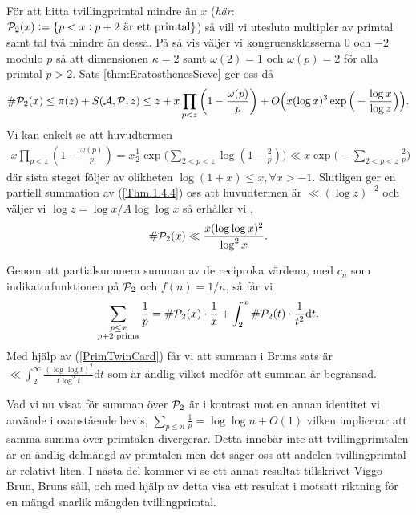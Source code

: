 För att hitta tvillingprimtal mindre än $x$ (\textit{här}: \( \P_2(x) := \{p < x : p + 2 \text{ är ett primtal}\}\)) så vill vi utesluta multipler av primtal samt tal två mindre än dessa. På så vis väljer vi kongruensklasserna $0$ och $-2$ modulo $p$ så att dimensionen \(\kappa = 2\) samt \(\omega(2) = 1\) och \(\omega(p) = 2\) för alla primtal $p > 2$. Sats \ref{thm:EratosthenesSieve} ger oss då 
\begin{align*}
    \card{\P_2(x)} \leq \pi(z) + \S{A}{P}{z} \leq z + x \prod_{p < z}\left( 1 - \frac{\omega(p)}{p} \right) + O\Big(x (\log x)^3 \exp \Big( - \frac{\log x}{\log z} \Big) \Big).
\end{align*}
Vi kan enkelt se att huvudtermen
\begin{align*}
    x \prod_{p < z}\left( 1 - \frac{\omega(p)}{p} \right) = x \frac{1}{2} \exp \Bigg( \sum_{2 <p < z} \log \left( 1 - \frac{2}{p} \right) \Bigg) \ll x \exp \Bigg( - \sum_{2 <p < z} \frac{2}{p}  \Bigg) 
\end{align*}
där sista steget följer av olikheten \(\log(1 + x) \leq x, \forall x > -1\). Slutligen ger en partiell summation av (\ref{Thm.1.4.4})  oss att huvudtermen är \(\ll (\log z)^{-2}\) och väljer vi \(\log z = \log x / A \log \log x\) så erhåller vi \cite[Sats 5.4.4]{cojocarumurty},
\begin{align} \label{PrimTwinCard}
    \card{\P_2(x)} \ll \frac{x (\log \log x)^2}{\log^2 x} .
\end{align}

Genom att partialsummera summan av de reciproka värdena, med \(c_n\) som indikatorfunktionen på \(\P_2\) och \(f(n) = 1 / n\), så får vi 
\begin{align*}
    \sum_{\substack{p \leq x \\ p + 2 \text{ prima}}} \frac{1}{p} = \card{\P_2(x)} \cdot \frac{1}{x} + \int_2^x \card{\P_2(t)} \cdot \frac{1}{t^2} \text{d}t . 
\end{align*}
Med hjälp av (\ref{PrimTwinCard}) får vi att summan i Bruns sats är \(\ll \int_2^\infty \frac{(\log \log t)^2}{t \log^2 t} \text{d}t\) som är ändlig vilket medför att summan är begränsad. 

Vad vi nu visat för summan över \(\P_2\) är i kontrast mot en annan identitet vi använde i ovanstående bevis, \(\sum_{p \leq n} \frac{1}{p} = \log \log n + O(1)\) vilken implicerar att samma summa över primtalen divergerar. Detta innebär inte att tvillingprimtalen är en ändlig delmängd av primtalen men det säger oss att andelen tvillingprimtal är relativt liten. I nästa del kommer vi se ett annat resultat tillskrivet Viggo Brun, Bruns såll, och med hjälp av detta visa ett resultat i motsatt riktning för en mängd snarlik mängden tvillingprimtal. 